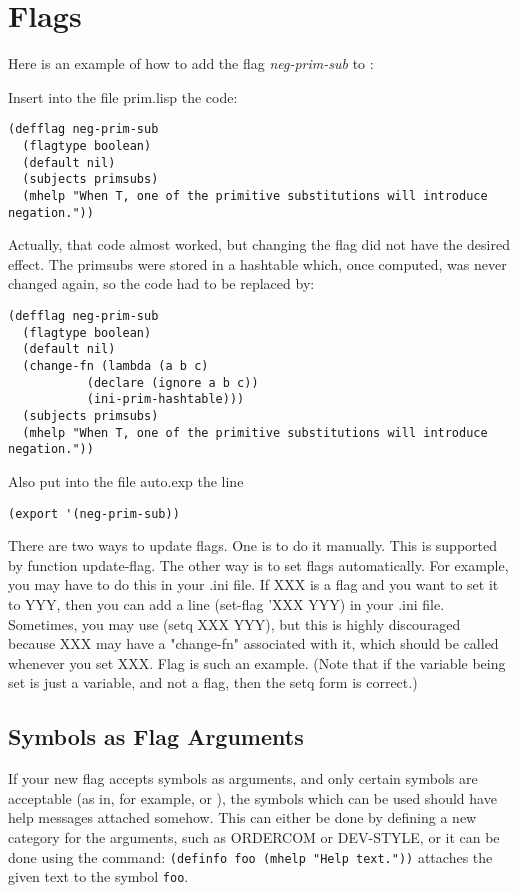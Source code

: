 \chapter{Flags}

Here is an example of how to add the flag {\it neg-prim-sub} to \TPS:

Insert into the file prim.lisp the code:
\begin{verbatim}
(defflag neg-prim-sub
  (flagtype boolean)
  (default nil)
  (subjects primsubs)
  (mhelp "When T, one of the primitive substitutions will introduce negation."))

\end{verbatim}

Actually, that code almost worked, but changing the flag did not have the
desired effect. The primsubs were stored in a hashtable which, once computed,
was never changed again, so the code had to be  
replaced by:

\begin{verbatim}
(defflag neg-prim-sub
  (flagtype boolean)
  (default nil)
  (change-fn (lambda (a b c)
	       (declare (ignore a b c))
	       (ini-prim-hashtable)))
  (subjects primsubs)
  (mhelp "When T, one of the primitive substitutions will introduce negation."))

\end{verbatim}

Also put into the file auto.exp the line
\begin{verbatim}
(export '(neg-prim-sub))
\end{verbatim}

There are two ways to update flags. One is to do it manually. This is
supported by function update-flag. The other way is to set flags
automatically. For example, you may have to do this in your .ini
file. If XXX is a flag and you want to set it to YYY, then you can add
a line (set-flag 'XXX YYY) in your .ini file. Sometimes, you may use
(setq XXX YYY), but this is highly discouraged because XXX may have a
"change-fn" associated with it, which should be called whenever you
set XXX. Flag  is such an example.
(Note that if the variable being set is just a variable, and not a \TPS
flag, then the setq form is correct.)

\section{Symbols as Flag Arguments}

If your new flag accepts symbols as arguments, and only certain symbols 
are acceptable (as in, for example,  or ),
the symbols which can be used should have help messages attached somehow. This can either
be done by defining a new category for the arguments, such as ORDERCOM or DEV-STYLE, or it can
be done using the  command: {\tt (definfo foo (mhelp "Help text."))} attaches
the given text to the symbol {\tt foo}.

